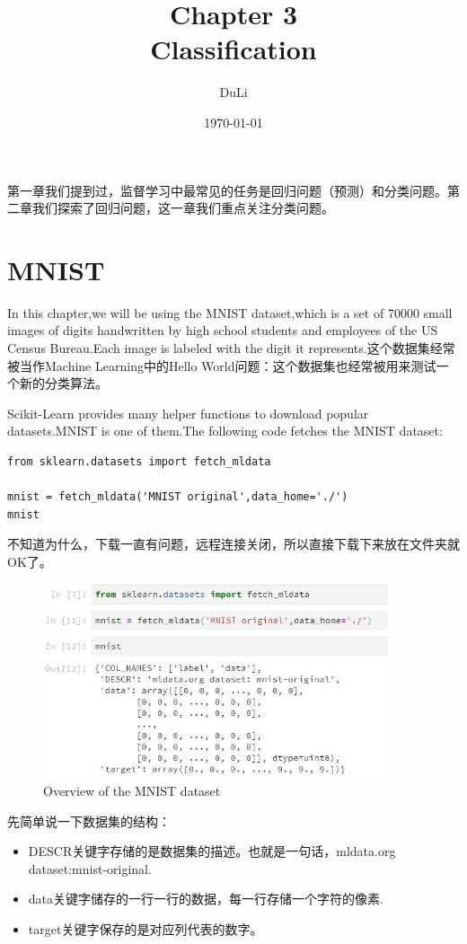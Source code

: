 \documentclass[UTF8]{ctexart}
\title{Chapter 3 \\Classification}
\author{DuLi}
\date{\today}
\begin{document}
\maketitle
\newpage
\tableofcontents
\newpage
第一章我们提到过，监督学习中最常见的任务是回归问题（预测）和分类问题。第二章我们探索了回归问题，这一章我们重点关注分类问题。
\section{MNIST}
\setlength{\parskip}{0.5em} 

In this chapter,we will be using the MNIST dataset,which is a set of 70000 small images of digits handwritten by high school students and employees of the US Census Bureau.Each image is labeled with the digit it represents.这个数据集经常被当作Machine Learning中的Hello World问题：这个数据集也经常被用来测试一个新的分类算法。

Scikit-Learn provides many helper functions to download popular datasets.MNIST is one of them.The following code fetches the MNIST dataset:

\begin{lstlisting}
from sklearn.datasets import fetch_mldata

mnist = fetch_mldata('MNIST original',data_home='./')
mnist
\end{lstlisting}
不知道为什么，下载一直有问题，远程连接关闭，所以直接下载下来放在文件夹就OK了。

\begin{figure}[H]
\centering
\includegraphics[width = 4in]{mnist_download.JPG}
\caption{Overview of the MNIST dataset}
\end{figure}

先简单说一下数据集的结构：
\begin{itemize}
	\item DESCR关键字存储的是数据集的描述。也就是一句话，mldata.org dataset:mnist-original.
	\item data关键字储存的一行一行的数据，每一行存储一个字符的像素.
	\item target关键字保存的是对应列代表的数字。
\end{itemize}
\end{document}
